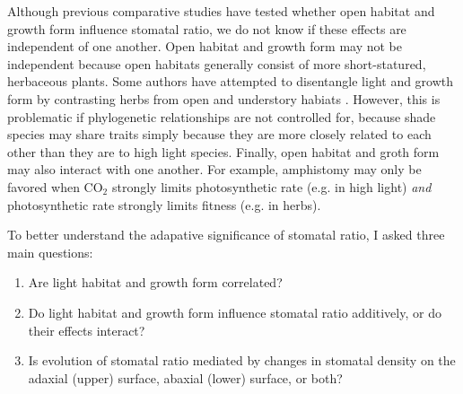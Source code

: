 \documentclass[12pt, oneside]{article}
\begin{document}

Although previous comparative studies have tested whether open habitat and growth form influence stomatal ratio, we do not know if these effects are independent of one another. Open habitat and growth form may not be independent because open habitats generally consist of more short-statured, herbaceous plants. Some authors have attempted to disentangle light and growth form by contrasting herbs from open and understory habiats \citep{Salisbury_1927}. However, this is problematic if phylogenetic relationships are not controlled for, because shade species may share traits simply because they are more closely related to each other than they are to high light species. Finally, open habitat and groth form may also interact with one another. For example, amphistomy may only be favored when CO$_2$ strongly limits photosynthetic rate (e.g. in high light) \textit{and} photosynthetic rate strongly limits fitness (e.g. in herbs).

To better understand the adapative significance of stomatal ratio, I asked three main questions:

\begin{enumerate}

  \item{Are light habitat and growth form correlated?}
  \item{Do light habitat and growth form influence stomatal ratio additively, or do their effects interact?}
  \item{Is evolution of stomatal ratio mediated by changes in stomatal density on the adaxial (upper) surface, abaxial (lower) surface, or both?}
  
\end{enumerate}
\end{document}
